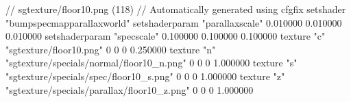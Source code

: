 // sgtexture/floor10.png (118)
// Automatically generated using cfgfix
setshader "bumpspecmapparallaxworld"
setshaderparam "parallaxscale" 0.010000 0.010000 0.010000
setshaderparam "specscale" 0.100000 0.100000 0.100000
texture "c" "sgtexture/floor10.png" 0 0 0 0.250000
texture "n" "sgtexture/specials/normal/floor10_n.png" 0 0 0 1.000000
texture "s" "sgtexture/specials/spec/floor10_s.png" 0 0 0 1.000000
texture "z" "sgtexture/specials/parallax/floor10_z.png" 0 0 0 1.000000
